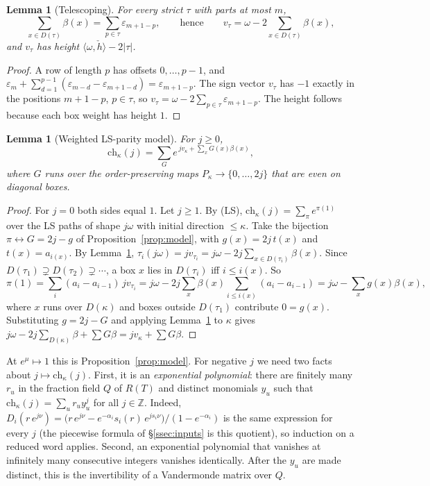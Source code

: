\documentclass[11pt]{amsart}
\newtheorem{lemma}[theorem]{Lemma}
\theoremstyle{definition}
\theoremstyle{remark}
\newcommand{\Z}{\mathbb{Z}}
\begin{document}
\begin{lemma}[Telescoping]\label{lem:telescope}
For every strict $\tau$ with parts at most $m$,
\[ \sum_{x\in D(\tau)}\beta(x)=\sum_{p\in\tau}\varepsilon_{m+1-p},\qquad\text{hence}\qquad
v_\tau=\omega-2\sum_{x\in D(\tau)}\beta(x), \]
and $v_\tau$ has height $\langle\omega,\check h\rangle-2|\tau|$.
\end{lemma}

\begin{proof}
A row of length $p$ has offsets $0,\dots,p-1$, and
$\varepsilon_m+\sum_{d=1}^{p-1}(\varepsilon_{m-d}-\varepsilon_{m+1-d})=\varepsilon_{m+1-p}$. The sign
vector $v_\tau$ has $-1$ exactly in the positions $m+1-p$, $p\in\tau$, so
$v_\tau=\omega-2\sum_{p\in\tau}\varepsilon_{m+1-p}$. The height follows because each box weight
has height $1$.
\end{proof}

\begin{lemma}[Weighted LS-parity model]\label{lem:Tchar}
For $j\ge0$,
\[ \mathrm{ch}_\kappa(j)=\sum_G e^{\,j v_\kappa+\sum_{x}G(x)\beta(x)}, \]
where $G$ runs over the order-preserving maps $P_\kappa\to\{0,\dots,2j\}$ that are even on
diagonal boxes.
\end{lemma}

\begin{proof}
For $j=0$ both sides equal $1$. Let $j\ge1$. By (LS), $\mathrm{ch}_\kappa(j)=\sum_\pi e^{\pi(1)}$
over the LS paths of shape $j\omega$ with initial direction $\le\kappa$. Take the bijection
$\pi\leftrightarrow G=2j-g$ of Proposition~\ref{prop:model}, with $g(x)=2j\,t(x)$ and
$t(x)=a_{i(x)}$. By Lemma~\ref{lem:telescope}, $\tau_i(j\omega)=jv_{\tau_i}=j\omega-2j\sum_{x\in
D(\tau_i)}\beta(x)$. Since $D(\tau_1)\supsetneq D(\tau_2)\supsetneq\cdots$, a box $x$ lies in $D(\tau_i)$
iff $i\le i(x)$. So
\[ \pi(1)=\sum_i(a_i-a_{i-1})\,jv_{\tau_i}=j\omega-2j\sum_x\beta(x)\sum_{i\le i(x)}(a_i-a_{i-1})
=j\omega-\sum_xg(x)\beta(x), \]
where $x$ runs over $D(\kappa)$ and boxes outside $D(\tau_1)$ contribute $0=g(x)$. Substituting
$g=2j-G$ and applying Lemma~\ref{lem:telescope} to $\kappa$ gives
$j\omega-2j\sum_{D(\kappa)}\beta+\sum G\beta=jv_\kappa+\sum G\beta$.
\end{proof}

At $e^\mu\mapsto1$ this is Proposition~\ref{prop:model}. For negative $j$ we need two facts about
$j\mapsto\mathrm{ch}_\kappa(j)$. First, it is an \emph{exponential polynomial}: there are finitely many
$r_u$ in the fraction field $Q$ of $R(T)$ and distinct monomials $y_u$ such that
$\mathrm{ch}_\kappa(j)=\sum_ur_uy_u^j$ for all $j\in\Z$. Indeed,
$D_i(r\,e^{j\nu})=\bigl(r\,e^{j\nu}-e^{-\alpha_i}s_i(r)\,e^{js_i\nu}\bigr)/(1-e^{-\alpha_i})$ is the same
expression for every $j$ (the piecewise formula of \S\ref{ssec:inputs} is this quotient), so
induction on a reduced word applies. Second, an exponential polynomial that vanishes at infinitely
many consecutive integers vanishes identically. After the $y_u$ are made distinct, this is the
invertibility of a Vandermonde matrix over $Q$.
\end{document}
